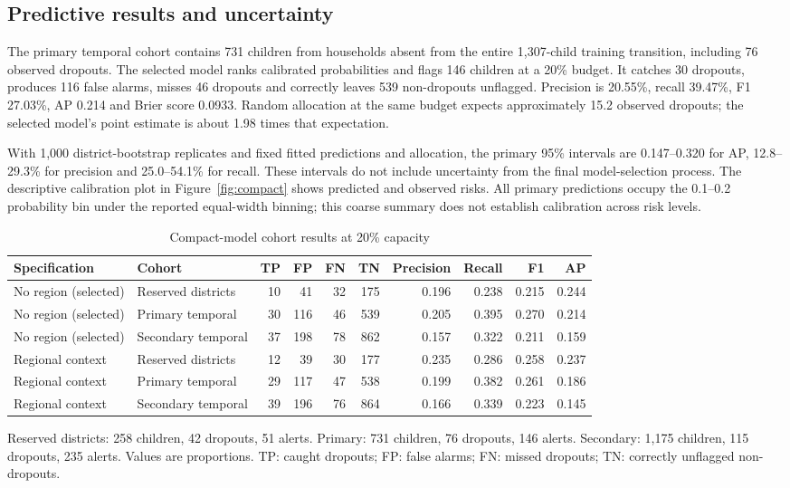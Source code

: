 \documentclass[conference,a4paper]{IEEEtran}
\newcommand{\tabnote}[1]{\par\vspace{3pt}\begin{minipage}{\linewidth}\footnotesize\raggedright #1\end{minipage}}
\begin{document}
\subsection{\textbf{Predictive results and uncertainty}}
The primary temporal cohort contains 731 children from households absent from the entire 1,307-child training transition, including 76 observed dropouts. The selected model ranks calibrated probabilities and flags 146 children at a 20\% budget. It catches 30 dropouts, produces 116 false alarms, misses 46 dropouts and correctly leaves 539 non-dropouts unflagged. Precision is 20.55\%, recall 39.47\%, F1 27.03\%, AP 0.214 and Brier score 0.0933. Random allocation at the same budget expects approximately 15.2 observed dropouts; the selected model's point estimate is about 1.98 times that expectation.

With 1,000 district-bootstrap replicates and fixed fitted predictions and allocation, the primary 95\% intervals are 0.147--0.320 for AP, 12.8--29.3\% for precision and 25.0--54.1\% for recall. These intervals do not include uncertainty from the final model-selection process. The descriptive calibration plot in Figure~\ref{fig:compact} shows predicted and observed risks. All primary predictions occupy the 0.1--0.2 probability bin under the reported equal-width binning; this coarse summary does not establish calibration across risk levels.

\begin{table}[!t]\centering\footnotesize\setlength{\tabcolsep}{4pt}
\caption{Compact-model cohort results at 20\% capacity}\label{tab:compactcohorts}
\begin{tabular}{llrrrrrrrr}\toprule
Specification & Cohort & TP & FP & FN & TN & Precision & Recall & F1 & AP\\\midrule
No region (selected) & Reserved districts & 10 & 41 & 32 & 175 & 0.196 & 0.238 & 0.215 & 0.244 \\
No region (selected) & Primary temporal & 30 & 116 & 46 & 539 & 0.205 & 0.395 & 0.270 & 0.214 \\
No region (selected) & Secondary temporal & 37 & 198 & 78 & 862 & 0.157 & 0.322 & 0.211 & 0.159 \\
Regional context & Reserved districts & 12 & 39 & 30 & 177 & 0.235 & 0.286 & 0.258 & 0.237 \\
Regional context & Primary temporal & 29 & 117 & 47 & 538 & 0.199 & 0.382 & 0.261 & 0.186 \\
Regional context & Secondary temporal & 39 & 196 & 76 & 864 & 0.166 & 0.339 & 0.223 & 0.145 \\
\bottomrule\end{tabular}
\tabnote{Reserved districts: 258 children, 42 dropouts, 51 alerts. Primary: 731 children, 76 dropouts, 146 alerts. Secondary: 1,175 children, 115 dropouts, 235 alerts. Values are proportions. TP: caught dropouts; FP: false alarms; FN: missed dropouts; TN: correctly unflagged non-dropouts.}
\end{table}
\end{document}
